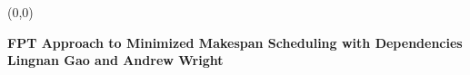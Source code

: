 \documentclass[a0]{a0poster}
\begin{document}
\newcommand{\defproblem}[4]{%
  \hfill\\\smallskip\noindent%
  \begin{tabularx}{.45 \textwidth}{|l|X|}%
    \hline%
    \multicolumn{2}{|l|}{{#1}}\\%
    \textbf{Input:}&#2\\%
    \textbf{Parameter:}&#3\\%
    \textbf{Question:}&#4\smallskip\\\hline%
  \end{tabularx}%
  \smallskip%
}%



\parindent=0pt
\baselineskip



%
%



\begin{textblock}{24}(0,0)
\begin{center}
\vspace{-0.25in}
\huge{\textbf{FPT Approach to Minimized Makespan Scheduling with Dependencies}}\\
\vspace{0.35in}
\large{\textbf{Lingnan Gao and Andrew Wright}}
 \end{center}
\end{textblock}
\end{document}
